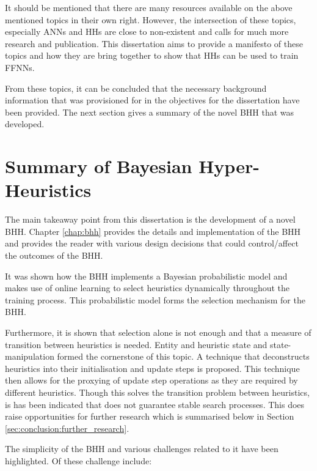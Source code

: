 It should be mentioned that there are many resources available on the above mentioned topics in their own right. However, the intersection of these topics, especially \acp{ANN} and \acp{HH} are close to non-existent and calls for much more research and publication. This dissertation aims to provide a manifesto of these topics and how they are bring together to show that \acp{HH} can be used to train \acp{FFNN}. 

From these topics, it can be concluded that the necessary background information that was provisioned for in the objectives for the dissertation have been provided. The next section gives a summary of the novel \ac{BHH} that was developed.


\section{Summary of Bayesian Hyper-Heuristics}
\label{sec:conclusion:bhh}

The main takeaway point from this dissertation is the development of a novel \ac{BHH}. Chapter \ref{chap:bhh} provides the details and implementation of the \ac{BHH} and provides the reader with various design decisions that could control/affect the outcomes of the \ac{BHH}.

It was shown how the \ac{BHH} implements a Bayesian probabilistic model and makes use of online learning to select heuristics dynamically throughout the training process. This probabilistic model forms the selection mechanism for the \ac{BHH}. 

Furthermore, it is shown that selection alone is not enough and that a measure of transition between heuristics is needed. Entity and heuristic state and state-manipulation formed the cornerstone of this topic. A technique that deconstructs heuristics into their initialisation and update steps is proposed. This technique then allows for the proxying of update step operations as they are required by different heuristics. Though this solves the transition problem between heuristics, is has been indicated that does not guarantee stable search processes. This does raise opportunities for further research which is summarised below in Section \ref{sec:conclusion:further_research}.

The simplicity of the \ac{BHH} and various challenges related to it have been highlighted. Of these challenge include:

